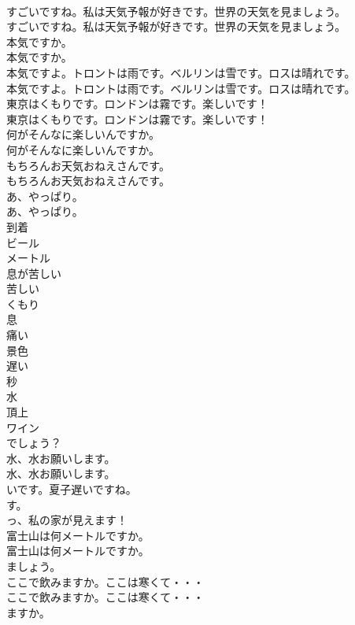\documentclass[8pt]{extreport}
\begin{document}
\begin{CJK}{UTF8}{min}
\\	すごいですね。私は天気予報が好きです。世界の天気を見ましょう。	
\\	すごいですね。私は天気予報が好きです。世界の天気を見ましょう。 
\\	本気ですか。	
\\	本気ですか。 
\\	本気ですよ。トロントは雨です。ベルリンは雪です。ロスは晴れです。	
\\	本気ですよ。トロントは雨です。ベルリンは雪です。ロスは晴れです。 
\\	東京はくもりです。ロンドンは霧です。楽しいです！	
\\	東京はくもりです。ロンドンは霧です。楽しいです！ 
\\	何がそんなに楽しいんですか。	
\\	何がそんなに楽しいんですか。 
\\	もちろんお天気おねえさんです。	
\\	もちろんお天気おねえさんです。 
\\	あ、やっぱり。	
\\	あ、やっぱり。 
\\	到着
\\	ビール
\\	メートル
\\	息が苦しい
\\	苦しい
\\	くもり
\\	息
\\	痛い
\\	景色
\\	遅い
\\	秒
\\	水
\\	頂上
\\	ワイン
\\	でしょう？	
\\	水、水お願いします。	
\\	水、水お願いします。 
\\	いです。夏子遅いですね。	
\\	す。	
\\	っ、私の家が見えます！	
\\	富士山は何メートルですか。	
\\	富士山は何メートルですか。 
\\	ましょう。	
\\	ここで飲みますか。ここは寒くて・・・	
\\	ここで飲みますか。ここは寒くて・・・ 
\\	ますか。	

\end{CJK}
\end{document}
